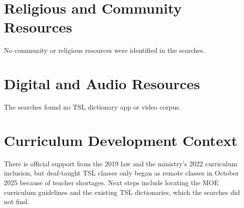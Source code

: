 \documentclass[12pt]{article}
\begin{document}
\section{Religious and Community Resources}
No community or religious resources were identified in the searches.

\section{Digital and Audio Resources}
The searches found no TSL dictionary app or video corpus.

\section{Curriculum Development Context}
There is official support from the 2019 law and the ministry's 2022 curriculum inclusion, but deaf-taught TSL classes only began as remote classes in October 2025 because of teacher shortages. Next steps include locating the MOE curriculum guidelines and the existing TSL dictionaries, which the searches did not find.
\end{document}
